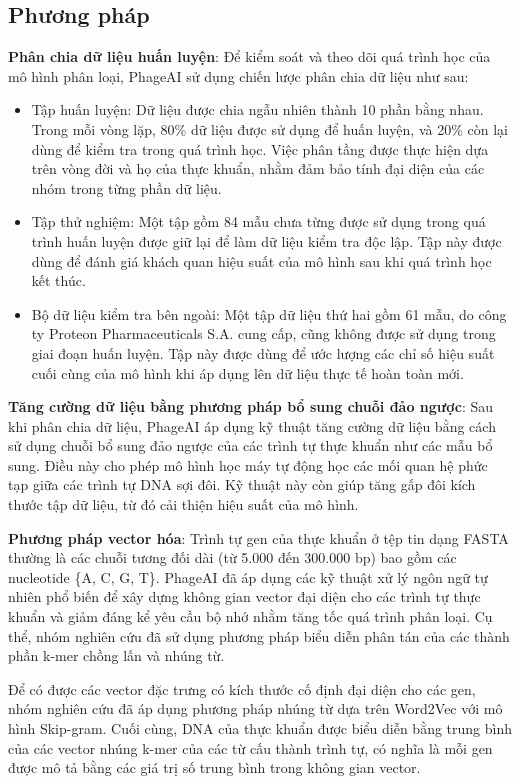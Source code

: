 \subsection*{Phương pháp}
\textbf{Phân chia dữ liệu huấn luyện}: Để kiểm soát và theo dõi quá trình học của mô hình phân loại, PhageAI sử dụng chiến lược phân chia dữ liệu như sau:
\begin{itemize}
    \item Tập huấn luyện: Dữ liệu được chia ngẫu nhiên thành 10 phần bằng nhau. Trong mỗi vòng lặp, 80\% dữ liệu được sử dụng để huấn luyện, và 20\% còn lại dùng để kiểm tra trong quá trình học. Việc phân tầng được thực hiện dựa trên vòng đời và họ của thực khuẩn, nhằm đảm bảo tính đại diện của các nhóm trong từng phần dữ liệu.
    
    \item Tập thử nghiệm: Một tập gồm 84 mẫu chưa từng được sử dụng trong quá trình huấn luyện được giữ lại để làm dữ liệu kiểm tra độc lập. Tập này được dùng để đánh giá khách quan hiệu suất của mô hình sau khi quá trình học kết thúc.
    
    \item Bộ dữ liệu kiểm tra bên ngoài: Một tập dữ liệu thứ hai gồm 61 mẫu, do công ty Proteon Pharmaceuticals S.A. cung cấp, cũng không được sử dụng trong giai đoạn huấn luyện. Tập này được dùng để ước lượng các chỉ số hiệu suất cuối cùng của mô hình khi áp dụng lên dữ liệu thực tế hoàn toàn mới.
\end{itemize}

\textbf{Tăng cường dữ liệu bằng phương pháp bổ sung chuỗi đảo ngược}: Sau khi phân chia dữ liệu, PhageAI áp dụng kỹ thuật tăng cường dữ liệu bằng cách sử dụng chuỗi bổ sung đảo ngược của các trình tự thực khuẩn như các mẫu bổ sung. Điều này cho phép mô hình học máy tự động học các mối quan hệ phức tạp giữa các trình tự DNA sợi đôi. Kỹ thuật này còn giúp tăng gấp đôi kích thước tập dữ liệu, từ đó cải thiện hiệu suất của mô hình.

\textbf{Phương pháp vector hóa}: Trình tự gen của thực khuẩn ở tệp tin dạng FASTA thường là các chuỗi tương đối dài (từ 5.000 đến 300.000 bp) bao gồm các nucleotide \{A, C, G, T\}. PhageAI đã áp dụng các kỹ thuật xử lý ngôn ngữ tự nhiên phổ biến để xây dựng không gian vector đại diện cho các trình tự thực khuẩn và giảm đáng kể yêu cầu bộ nhớ nhằm tăng tốc quá trình phân loại. Cụ thể, nhóm nghiên cứu đã sử dụng phương pháp biểu diễn phân tán của các thành phần k-mer chồng lấn và nhúng từ.

Để có được các vector đặc trưng có kích thước cố định đại diện cho các gen, nhóm nghiên cứu đã áp dụng phương pháp nhúng từ dựa trên Word2Vec với mô hình Skip-gram. Cuối cùng, DNA của thực khuẩn được biểu diễn bằng trung bình của các vector nhúng k-mer của các từ cấu thành trình tự, có nghĩa là mỗi gen được mô tả bằng các giá trị số trung bình trong không gian vector.

